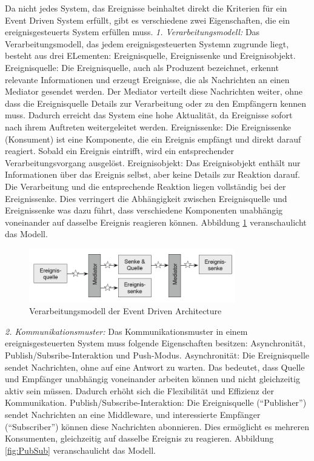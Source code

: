 \documentclass[a4paper,12pt]{article}
\begin{document}
Da nicht jedes System, das Ereignisse beinhaltet direkt die Kriterien für ein Event Driven System erfüllt, gibt es verschiedene zwei Eigenschaften, die ein ereignisgesteuerts System erfüllen muss. \newline
\textit{1. Verarbeitungsmodell:} \newline
Das Verarbeitungsmodell, das jedem ereignisgesteuerten Systemn zugrunde liegt, besteht aus drei ELementen: Ereignisquelle, Ereignissenke und Ereignisobjekt.
Ereignisquelle: Die Ereignisquelle, auch als Produzent bezeichnet, erkennt relevante Informationen und erzeugt Ereignisse, die als Nachrichten an einen Mediator gesendet werden. Der Mediator verteilt diese Nachrichten weiter, ohne dass die Ereignisquelle Details zur Verarbeitung oder zu den Empfängern kennen muss. Dadurch erreicht das System eine hohe Aktualität, da Ereignisse sofort nach ihrem Auftreten weitergeleitet werden.
Ereignissenke: Die Ereignissenke (Konsument) ist eine Komponente, die ein Ereignis empfängt und direkt darauf reagiert. Sobald ein Ereignis eintrifft, wird ein entsprechender Verarbeitungsvorgang ausgelöst.
Ereignisobjekt: Das Ereignisobjekt enthält nur Informationen über das Ereignis selbst, aber keine Details zur Reaktion darauf. Die Verarbeitung und die entsprechende Reaktion liegen vollständig bei der Ereignissenke. Dies verringert die Abhängigkeit zwischen Ereignisquelle und Ereignissenke was dazu führt, dass verschiedene Komponenten unabhängig voneinander auf dasselbe Ereignis reagieren können. \cite[S. 51f]{Bruns2010} \newline
Abbildung \ref{fig:Verarbeitungsmodell} veranschaulicht das Modell. 

\begin{figure}[h]
    \centering
    \includegraphics[width=0.8\textwidth]{images/Verarbeitungsmodell.png}
    \caption{Verarbeitungsmodell der Event Driven Architecture \cite[S. 52]{Bruns2010}}
    \label{fig:Verarbeitungsmodell}
\end{figure}

\textit{2. Kommunikationsmuster:} \newline
Das Kommunikationsmuster in einem ereignisgesteuerten System muss folgende Eigenschaften besitzen: Asynchronität, Publish/Subsribe-Interaktion und Push-Modus.
Asynchronität: Die Ereignisquelle sendet Nachrichten, ohne auf eine Antwort zu warten. Das bedeutet, dass Quelle und Empfänger unabhängig voneinander arbeiten können und nicht gleichzeitig aktiv sein müssen. Dadurch erhöht sich die Flexibilität und Effizienz der Kommunikation.
Publish/Subscribe-Interaktion: Die Ereignisquelle (“Publisher”) sendet Nachrichten an eine Middleware, und interessierte Empfänger (“Subscriber”) können diese Nachrichten abonnieren. Dies ermöglicht es mehreren Konsumenten, gleichzeitig auf dasselbe Ereignis zu reagieren.
Abbildung \ref{fig:PubSub} veranschaulicht das Modell.
\end{document}
